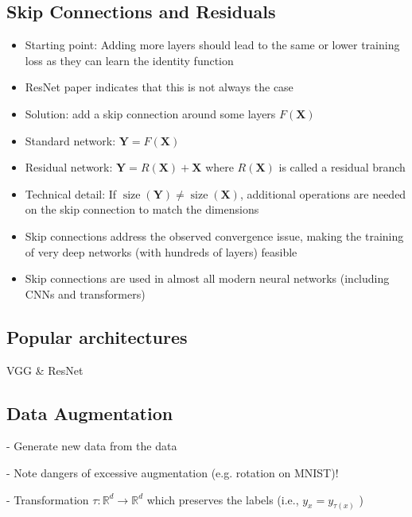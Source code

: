 \subsection*{Skip Connections and Residuals}
\begin{itemize}
  \item Starting point: Adding more layers should lead to the same or lower training loss as they can learn the identity function

  \item ResNet paper indicates that this is not always the case

  \item Solution: add a skip connection around some layers $F(\mathbf{X})$

  \item Standard network: $\mathbf{Y}=F(\mathbf{X})$

  \item Residual network: $\mathbf{Y}=R(\mathbf{X})+\mathbf{X}$ where $R(\mathbf{X})$ is called a residual branch


  \item Technical detail: If $\operatorname{size}(\mathbf{Y}) \neq \operatorname{size}(\mathbf{X})$, additional operations are needed on the skip connection to match the dimensions

  \item Skip connections address the observed convergence issue, making the training of very deep networks (with hundreds of layers) feasible

  \item Skip connections are used in almost all modern neural networks (including CNNs and transformers)

\end{itemize}


\subsection*{Popular architectures}

VGG \& ResNet


\subsection*{Data Augmentation}
- Generate new data from the data

- Note dangers of excessive augmentation (e.g. rotation on MNIST)!

- Transformation $\tau: \mathbb{R}^{d} \rightarrow \mathbb{R}^{d}$ which preserves the labels (i.e., $y_{x}=y_{\tau(x)}$ )

